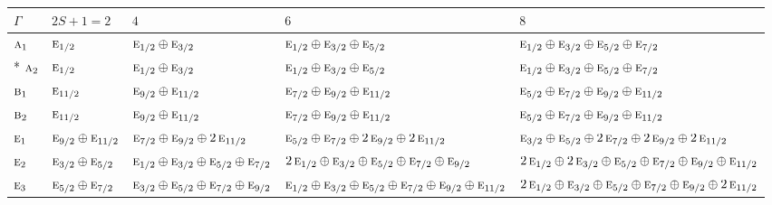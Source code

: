 \documentclass[10pt,a4paper]{article}
\numberwithin{equation}{section}
\newcommand{\irr}[1]{\text{\normalfont\scshape #1}}
\begin{document}
{\small\setlength{\tabcolsep}{3pt}\begin{longtable}{@{}l>{\RaggedRight\arraybackslash}p{}>{\RaggedRight\arraybackslash}p{}>{\RaggedRight\arraybackslash}p{}>{\RaggedRight\arraybackslash}p{}@{}}\toprule
$\Gamma$ & $2S + 1 = 2$ & $4$ & $6$ & $8$\\\midrule\endhead
\bottomrule\endfoot\endlastfoot
$\irr{a}_{1}$ & $\irr{e}_{1/2}$ & $\irr{e}_{1/2}\oplus \irr{e}_{3/2}$ & $\irr{e}_{1/2}\oplus \irr{e}_{3/2}\oplus \irr{e}_{5/2}$ & $\irr{e}_{1/2}\oplus \irr{e}_{3/2}\oplus \irr{e}_{5/2}\oplus \irr{e}_{7/2}$\\*
$\irr{a}_{2}$ & $\irr{e}_{1/2}$ & $\irr{e}_{1/2}\oplus \irr{e}_{3/2}$ & $\irr{e}_{1/2}\oplus \irr{e}_{3/2}\oplus \irr{e}_{5/2}$ & $\irr{e}_{1/2}\oplus \irr{e}_{3/2}\oplus \irr{e}_{5/2}\oplus \irr{e}_{7/2}$\\
$\irr{b}_{1}$ & $\irr{e}_{11/2}$ & $\irr{e}_{9/2}\oplus \irr{e}_{11/2}$ & $\irr{e}_{7/2}\oplus \irr{e}_{9/2}\oplus \irr{e}_{11/2}$ & $\irr{e}_{5/2}\oplus \irr{e}_{7/2}\oplus \irr{e}_{9/2}\oplus \irr{e}_{11/2}$\\
$\irr{b}_{2}$ & $\irr{e}_{11/2}$ & $\irr{e}_{9/2}\oplus \irr{e}_{11/2}$ & $\irr{e}_{7/2}\oplus \irr{e}_{9/2}\oplus \irr{e}_{11/2}$ & $\irr{e}_{5/2}\oplus \irr{e}_{7/2}\oplus \irr{e}_{9/2}\oplus \irr{e}_{11/2}$\\
$\irr{e}_{1}$ & $\irr{e}_{9/2}\oplus \irr{e}_{11/2}$ & $\irr{e}_{7/2}\oplus \irr{e}_{9/2}\oplus 2\,\irr{e}_{11/2}$ & $\irr{e}_{5/2}\oplus \irr{e}_{7/2}\oplus 2\,\irr{e}_{9/2}\oplus 2\,\irr{e}_{11/2}$ & $\irr{e}_{3/2}\oplus \irr{e}_{5/2}\oplus 2\,\irr{e}_{7/2}\oplus 2\,\irr{e}_{9/2}\oplus 2\,\irr{e}_{11/2}$\\
$\irr{e}_{2}$ & $\irr{e}_{3/2}\oplus \irr{e}_{5/2}$ & $\irr{e}_{1/2}\oplus \irr{e}_{3/2}\oplus \irr{e}_{5/2}\oplus \irr{e}_{7/2}$ & $2\,\irr{e}_{1/2}\oplus \irr{e}_{3/2}\oplus \irr{e}_{5/2}\oplus \irr{e}_{7/2}\oplus \irr{e}_{9/2}$ & $2\,\irr{e}_{1/2}\oplus 2\,\irr{e}_{3/2}\oplus \irr{e}_{5/2}\oplus \irr{e}_{7/2}\oplus \irr{e}_{9/2}\oplus \irr{e}_{11/2}$\\
$\irr{e}_{3}$ & $\irr{e}_{5/2}\oplus \irr{e}_{7/2}$ & $\irr{e}_{3/2}\oplus \irr{e}_{5/2}\oplus \irr{e}_{7/2}\oplus \irr{e}_{9/2}$ & $\irr{e}_{1/2}\oplus \irr{e}_{3/2}\oplus \irr{e}_{5/2}\oplus \irr{e}_{7/2}\oplus \irr{e}_{9/2}\oplus \irr{e}_{11/2}$ & $2\,\irr{e}_{1/2}\oplus \irr{e}_{3/2}\oplus \irr{e}_{5/2}\oplus \irr{e}_{7/2}\oplus \irr{e}_{9/2}\oplus 2\,\irr{e}_{11/2}$\\

\end{longtable}}
\end{document}

